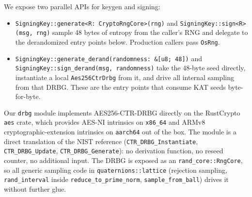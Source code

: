 We expose two parallel APIs for keygen and signing:
\begin{itemize}
  \item \texttt{SigningKey::generate<R: CryptoRngCore>(rng)} and
    \texttt{SigningKey::sign<R>(msg, rng)} sample 48 bytes of entropy
    from the caller's RNG and delegate to the derandomized entry
    points below.  Production callers pass \texttt{OsRng}.
  \item \texttt{SigningKey::generate\_derand(randomness: \&[u8;
    48])} and \texttt{SigningKey::sign\_derand(msg, randomness)}
    take the 48-byte seed directly, instantiate a local
    \texttt{Aes256CtrDrbg} from it, and drive all internal sampling
    from that DRBG.  These are the entry points that consume KAT
    seeds byte-for-byte.
\end{itemize}

Our \texttt{drbg} module implements AES256-CTR-DRBG directly on the
RustCrypto \texttt{aes} crate, which provides AES-NI intrinsics on
\texttt{x86\_64} and ARMv8 cryptographic-extension intrinsics on
\texttt{aarch64} out of the box.  The module is a direct
translation of the NIST reference (\texttt{CTR\_DRBG\_Instantiate},
\texttt{CTR\_DRBG\_Update}, \texttt{CTR\_DRBG\_Generate}): no
derivation function, no reseed counter, no additional input.  The
DRBG is exposed as an \texttt{rand\_core::RngCore}, so all
generic sampling code in \texttt{quaternions::lattice} (rejection
sampling, \texttt{rand\_interval} inside \texttt{reduce\_to\_prime\_norm},
\texttt{sample\_from\_ball}) drives it without further glue.
